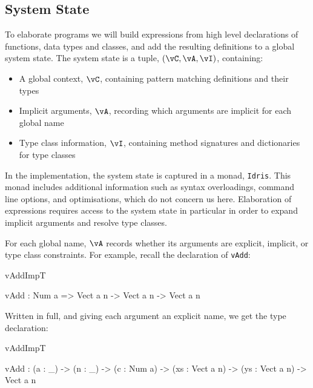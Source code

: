 



\subsection{System State}

\label{sect:sysstate}

To elaborate \Idris{} programs we will build expressions from high level
declarations of functions, data types and classes, and add the resulting
definitions to a global system state.
The system state is a tuple, $(\vC,\vA,\vI)$, containing:

\begin{itemize}
\item A global context, $\vC$, containing pattern matching definitions and their types
\item Implicit arguments, $\vA$, recording which arguments are implicit for each global name
\item Type class information, $\vI$, containing method signatures and dictionaries for type classes
\end{itemize}

In the implementation, the system state is captured in a monad, \texttt{Idris}.
This monad includes additional information such as syntax overloadings,
command line options, and optimisations, which do not concern us here. Elaboration
of expressions requires access to the system state in particular in order to expand
implicit arguments and resolve type classes. 

For each global name, $\vA$ records whether its arguments are explicit, implicit,
or type class constraints.  For example, recall the declaration
of \texttt{vAdd}:

\begin{SaveVerbatim}{vAddImpT}

vAdd : Num a => Vect a n -> Vect a n -> Vect a n

\end{SaveVerbatim}

\noindent
Written in full, and giving each argument an explicit name, we get the
type declaration:

\begin{SaveVerbatim}{vAddImpT}

vAdd : (a : _) -> (n : _) -> (c : Num a) -> 
       (xs : Vect a n) -> (ys : Vect a n) -> Vect a n

\end{SaveVerbatim}

